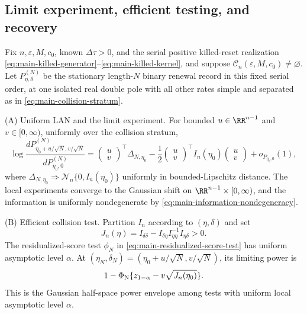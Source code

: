 \subsection{Limit experiment, efficient testing, and recovery}

\begin{theorem}
\label{thm:stationary-serial-double-pole-main}
Fix \(n,\varepsilon,M,c_0\), known \(\Delta\tau>0\), and the serial positive
killed-reset realization \eqref{eq:main-killed-generator}--\eqref{eq:main-killed-kernel}, and suppose
\(\mathcal C_n(\varepsilon,M,c_0)\ne\varnothing\).  Let
\(P_{\eta,\delta}^{(N)}\) be the stationary length-\(N\) binary renewal
record in this fixed serial order, at one isolated real double pole with all
other rates simple and separated as in \eqref{eq:main-collision-stratum}.

\smallskip\noindent\textup{(A) Uniform LAN and the limit experiment.}
For bounded \(u\in\RR^{n-1}\) and \(v\in[0,\infty)\), uniformly over the
collision stratum,
\begin{equation}
 \log\frac{dP_{\eta_0+u/\sqrt N,v/\sqrt N}^{(N)}}
 {dP_{\eta_0,0}^{(N)}}
 =\begin{pmatrix}u\\v\end{pmatrix}^{\!\top}\Delta_{N,\eta_0}
 -\frac12\begin{pmatrix}u\\v\end{pmatrix}^{\!\top}
 I_n(\eta_0)\begin{pmatrix}u\\v\end{pmatrix}
 +o_{P_{\eta_0,0}}(1),
\label{eq:main-stationary-lan}
\end{equation}
where
\(\Delta_{N,\eta_0}\Rightarrow\mathcal N_n\{0,I_n(\eta_0)\}\)
uniformly in bounded-Lipschitz distance.  The local experiments converge to
the Gaussian shift on \(\RR^{n-1}\times[0,\infty)\), and the information is
uniformly nondegenerate by \eqref{eq:main-information-nondegeneracy}.

\smallskip\noindent\textup{(B) Efficient collision test.}
Partition \(I_n\) according to \((\eta,\delta)\) and set
\begin{equation}
 J_n(\eta)=I_{\delta\delta}
 -I_{\delta\eta}I_{\eta\eta}^{-1}I_{\eta\delta}>0.
\label{eq:main-population-schur-complement}
\end{equation}
The residualized-score test \(\phi_N\) in \eqref{eq:main-residualized-score-test} has uniform
asymptotic level \(\alpha\).  At
\((\eta_N,\delta_N)=(\eta_0+u/\sqrt N,v/\sqrt N)\), its limiting power is
\begin{equation}
 1-\Phi_{\rm N}\{z_{1-\alpha}-v\sqrt{J_n(\eta_0)}\}.
\label{eq:main-power-envelope}
\end{equation}
This is the Gaussian half-space power envelope among tests with uniform local
asymptotic level \(\alpha\).


\end{theorem}

